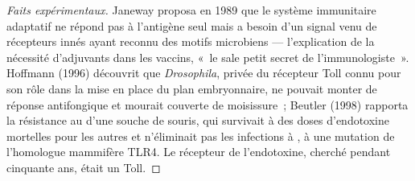 \begin{proof}[Faits expérimentaux]
Janeway proposa en 1989 que le système immunitaire adaptatif ne répond
pas à l'antigène seul mais a besoin d'un signal venu de récepteurs innés
ayant reconnu des motifs microbiens --- l'explication de la nécessité
d'adjuvants dans les vaccins, «~le sale petit secret de
l'immunologiste~». Hoffmann (1996) découvrit que \emph{Drosophila},
privée du récepteur Toll connu pour son rôle dans la mise en place du
plan embryonnaire, ne pouvait monter de réponse antifongique et mourait
couverte de moisissure~; Beutler (1998) rapporta la résistance au
 d'une souche de souris, qui survivait à des doses
d'endotoxine mortelles pour les autres et n'éliminait pas les infections
à , à une mutation de l'homologue mammifère TLR4. Le
récepteur de l'endotoxine, cherché pendant cinquante ans, était un Toll.
\end{proof}

